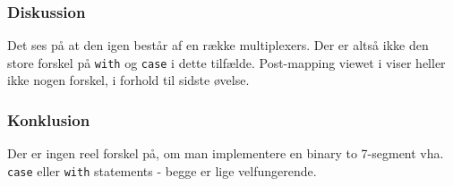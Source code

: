 {    

\subsubsection{Diskussion}

Det ses på  at den igen består af en række multiplexers. Der er altså ikke den store forskel på \texttt{with} og \texttt{case} i dette tilfælde. Post-mapping viewet i  viser heller ikke nogen forskel, i forhold til sidste øvelse.

\subsubsection{Konklusion}

Der er ingen reel forskel på, om man implementere en binary to 7-segment vha. \texttt{case} eller \texttt{with} statements - begge er lige velfungerende.
        
}